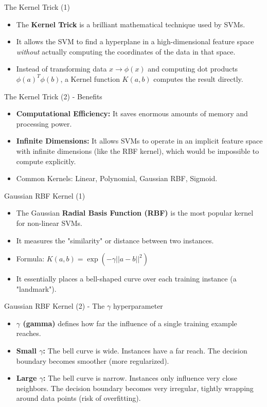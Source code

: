 \documentclass[aspectratio=169]{beamer}
\begin{document}
\begin{frame}{The Kernel Trick (1)}
\begin{itemize}
    \item The \textbf{Kernel Trick} is a brilliant mathematical technique used by SVMs.
    \item It allows the SVM to find a hyperplane in a high-dimensional feature space \textit{without} actually computing the coordinates of the data in that space.
    \item Instead of transforming data $x \rightarrow \phi(x)$ and computing dot products $\phi(a)^T \phi(b)$, a Kernel function $K(a,b)$ computes the result directly.
\end{itemize}
\end{frame}

\begin{frame}{The Kernel Trick (2) - Benefits}
\begin{itemize}
    \item \textbf{Computational Efficiency:} It saves enormous amounts of memory and processing power.
    \item \textbf{Infinite Dimensions:} It allows SVMs to operate in an implicit feature space with infinite dimensions (like the RBF kernel), which would be impossible to compute explicitly.
    \item Common Kernels: Linear, Polynomial, Gaussian RBF, Sigmoid.
\end{itemize}
\end{frame}

\begin{frame}{Gaussian RBF Kernel (1)}
\begin{itemize}
    \item The Gaussian \textbf{Radial Basis Function (RBF)} is the most popular kernel for non-linear SVMs.
    \item It measures the "similarity" or distance between two instances.
    \item Formula: $K(a, b) = \exp(-\gamma ||a - b||^2)$
    \item It essentially places a bell-shaped curve over each training instance (a "landmark").
\end{itemize}
\end{frame}

\begin{frame}{Gaussian RBF Kernel (2) - The $\gamma$ hyperparameter}
\begin{itemize}
    \item \textbf{$\gamma$ (gamma)} defines how far the influence of a single training example reaches.
    \item \textbf{Small $\gamma$:} The bell curve is wide. Instances have a far reach. The decision boundary becomes smoother (more regularized).
    \item \textbf{Large $\gamma$:} The bell curve is narrow. Instances only influence very close neighbors. The decision boundary becomes very irregular, tightly wrapping around data points (risk of overfitting).
\end{itemize}
\end{frame}
\end{document}
